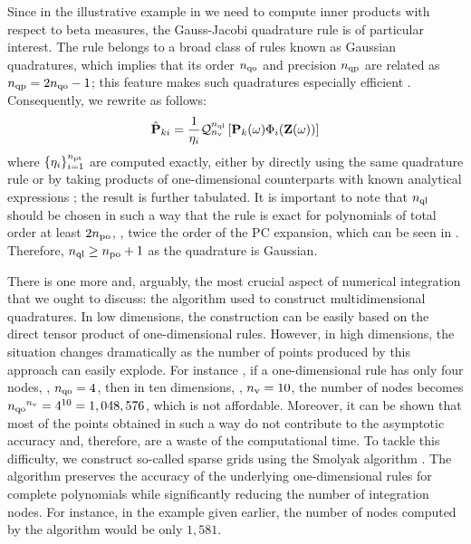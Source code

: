 Since in the illustrative example in  we need to compute inner products with respect to beta measures, the Gauss-Jacobi quadrature rule is of particular interest.
The rule belongs to a broad class of rules known as Gaussian quadratures, which implies that its order ${n_\text{qo}}$ and precision ${n_\text{qp}}$ are related as ${n_\text{qp}} = 2 {n_\text{qo}} - 1$; this feature makes such quadratures especially efficient \cite{heiss2008}.
Consequently, we rewrite  as follows:
\[
  \hat{\mathbf{P}}_{ki} = \frac{1}{\eta_i} \mathcal{Q}_{{n_\text{v}}}^{{n_\text{ql}}}\left[\mathbf{P}_k(\omega) \Phi_i(\mathbf{Z}(\omega))\right]
\]
where $\{ \eta_i \}_{i = 1}^{{n_\text{pt}}}$ are computed exactly, either by directly using the same quadrature rule or by taking products of one-dimensional counterparts with known analytical expressions \cite{xiu2010}; the result is further tabulated.
It is important to note that ${n_\text{ql}}$ should be chosen in such a way that the rule is exact for polynomials of total order at least $2 {n_\text{po}}$, \ie, twice the order of the PC expansion, which can be seen in  \cite{eldred2008}.
Therefore, ${n_\text{ql}} \geq {n_\text{po}} + 1$ as the quadrature is Gaussian.

There is one more and, arguably, the most crucial aspect of numerical integration that we ought to discuss: the algorithm used to construct multidimensional quadratures.
In low dimensions, the construction can be easily based on the direct tensor product of one-dimensional rules.
However, in high dimensions, the situation changes dramatically as the number of points produced by this approach can easily explode.
For instance \cite{heiss2008}, if a one-dimensional rule has only four nodes, \ie, ${n_\text{qo}} = 4$, then in ten dimensions, \ie, ${n_\text{v}} = 10$, the number of nodes becomes ${n_\text{qo}}^{n_\text{v}} = 4^{10} = 1,048,576$, which is not affordable.
Moreover, it can be shown that most of the points obtained in such a way do not contribute to the asymptotic accuracy and, therefore, are a waste of the computational time.
To tackle this difficulty, we construct so-called sparse grids using the Smolyak algorithm \cite{eldred2008, burkardt2013, heiss2008}.
The algorithm preserves the accuracy of the underlying one-dimensional rules for complete polynomials while significantly reducing the number of integration nodes.
For instance, in the example given earlier, the number of nodes computed by the algorithm would be only $1,581$.
